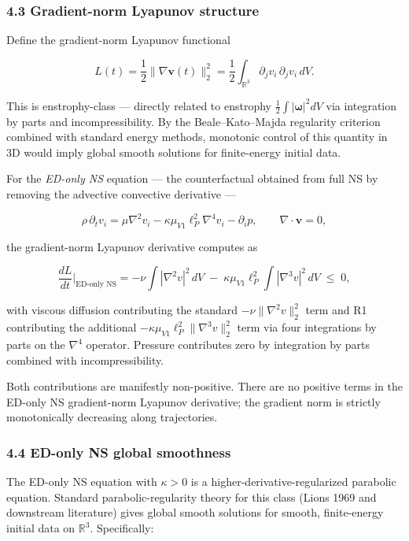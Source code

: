 \documentclass[
  11pt,a4paper]{article}
\begin{document}
\subsubsection{4.3 Gradient-norm Lyapunov
structure}\label{gradient-norm-lyapunov-structure}

Define the gradient-norm Lyapunov functional

\[L(t) = \frac{1}{2} \|\nabla \mathbf{v}(t)\|_2^2 = \frac{1}{2} \int_{\mathbb{R}^3} \partial_j v_i \, \partial_j v_i \, dV.\]

This is enstrophy-class --- directly related to enstrophy
\(\frac{1}{2}\int|\boldsymbol{\omega}|^2 dV\) via integration by parts
and incompressibility. By the Beale--Kato--Majda regularity criterion
combined with standard energy methods, monotonic control of this
quantity in 3D would imply global smooth solutions for finite-energy
initial data.

For the \emph{ED-only NS} equation --- the counterfactual obtained from
full NS by removing the advective convective derivative ---

\[\rho\,\partial_t v_i = \mu\nabla^2 v_i - \kappa\mu_{V1}\ell_P^2\nabla^4 v_i - \partial_i p, \qquad \nabla\cdot\mathbf{v} = 0,\]

the gradient-norm Lyapunov derivative computes as

\[\frac{dL}{dt}\bigg|_\text{ED-only NS} = -\nu \int |\nabla^2 v|^2 \, dV \;-\; \kappa \mu_{V1} \ell_P^2 \int |\nabla^3 v|^2 \, dV \;\le\; 0,\]

with viscous diffusion contributing the standard
\(-\nu \|\nabla^2 v\|_2^2\) term and R1 contributing the additional
\(-\kappa\mu_{V1}\ell_P^2 \|\nabla^3 v\|_2^2\) term via four
integrations by parts on the \(\nabla^4\) operator. Pressure contributes
zero by integration by parts combined with incompressibility.

Both contributions are manifestly non-positive. There are no positive
terms in the ED-only NS gradient-norm Lyapunov derivative; the gradient
norm is strictly monotonically decreasing along trajectories.

\subsubsection{4.4 ED-only NS global
smoothness}\label{ed-only-ns-global-smoothness}

The ED-only NS equation with \(\kappa > 0\) is a
higher-derivative-regularized parabolic equation. Standard
parabolic-regularity theory for this class (Lions 1969 and downstream
literature) gives global smooth solutions for smooth, finite-energy
initial data on \(\mathbb{R}^3\). Specifically:
\end{document}
